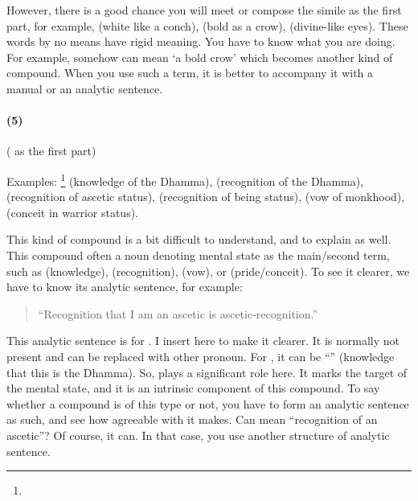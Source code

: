 However, there is a good chance you will meet or compose the simile as the first part, for example,  (white like a conch),  (bold as a crow),  (divine-like eyes). These words by no means have rigid meaning. You have to know what you are doing. For example,  somehow can mean `a bold crow' which becomes another kind of compound. When you use such a term, it is better to accompany it with a manual or an analytic sentence.

\paragraph*{(5) } ( as the first part)\par
Examples: \footnote{} (knowledge of the Dhamma),  (recognition of the Dhamma),  (recognition of ascetic status),  (recognition of being status),  (vow of monkhood),  (conceit in warrior status).

This kind of compound is a bit difficult to understand, and to explain as well. This compound often a noun denoting mental state as the main/second term, such as  (knowledge),  (recognition),  (vow), or  (pride/conceit). To see it clearer, we have to know its analytic sentence, for example:

\begin{quote}
``Recognition that I am an ascetic is ascetic-recognition.''
\end{quote}

This analytic sentence is for . I insert  here to make it clearer. It is normally not present and can be replaced with other pronoun. For , it can be ``'' (knowledge that this is the Dhamma). So,  plays a significant role here. It marks the target of the mental state, and it is an intrinsic component of this compound. To say whether a compound is of this type or not, you have to form an analytic sentence as such, and see how agreeable with  it makes. Can  mean ``recognition of an ascetic''? Of course, it can. In that case, you use another structure of analytic sentence.

